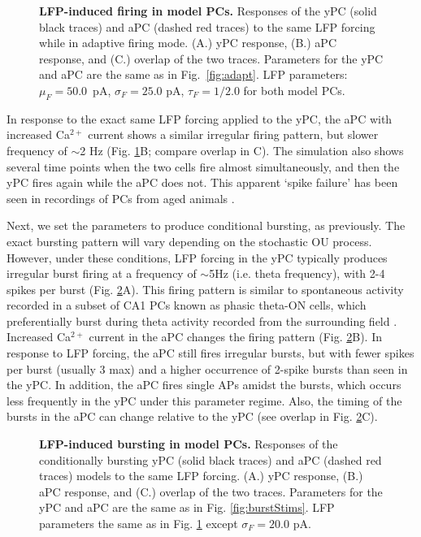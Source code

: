 \documentclass[10pt,letterpaper]{article}
\newcommand{\Ca}{Ca$^{2+}$}
\begin{document}
\begin{figure}[h!]
\centering
\caption{{\bf LFP-induced firing in model PCs.}
Responses of the yPC (solid black traces) and aPC (dashed red traces) to the same LFP forcing while in adaptive firing mode. (A.) yPC response, (B.) aPC response, and (C.) overlap of the two traces. Parameters for the yPC and aPC are the same as in Fig.~\ref{fig:adapt}. LFP parameters: $\mu_{F}=50.0$~pA, $\sigma_{F}=25.0$ pA, $\tau_{F}=1/2.0$ for both model PCs.}
\label{fig:LFPadaptive}
\end{figure}

In response to the exact same LFP forcing applied to the yPC, the aPC with increased {\Ca} current shows a similar irregular firing pattern, but slower frequency of $\sim$2 Hz (Fig. \ref{fig:LFPadaptive}B; compare overlap in C). The simulation also shows several time points when the two cells fire almost simultaneously, and then the yPC fires again while the aPC does not. This apparent `spike failure' has been seen in recordings of PCs from aged animals \cite{gant2009action}. 

Next, we set the parameters to produce conditional bursting, as previously. The exact bursting pattern will vary depending on the stochastic OU process. However, under these conditions, LFP forcing in the yPC typically produces irregular burst firing at a frequency of $\sim$5Hz (i.e. theta frequency), with 2-4 spikes per burst (Fig. \ref{fig:LFPbursting}A). This firing pattern is similar to spontaneous activity recorded in a subset of CA1 PCs known as phasic theta-ON cells, which preferentially burst during theta activity recorded from the surrounding field \cite{bland2005heterogeneity,colom1987state}. Increased {\Ca} current in the aPC changes the firing pattern (Fig. \ref{fig:LFPbursting}B). In response to LFP forcing, the aPC still fires irregular bursts, but with fewer spikes per burst (usually 3 max) and a higher occurrence of 2-spike bursts than seen in the yPC. In addition, the aPC fires single APs amidst the bursts, which occurs less frequently in the yPC under this parameter regime. Also, the timing of the bursts in the aPC can change relative to the yPC (see overlap in Fig. \ref{fig:LFPbursting}C).

\begin{figure}[h!]
\centering
\caption{{\bf LFP-induced bursting in model PCs.}
Responses of the conditionally bursting yPC (solid black traces) and aPC (dashed red traces) models to the same LFP forcing. (A.) yPC response, (B.) aPC response, and (C.) overlap of the two traces. Parameters for the yPC and aPC are the same as in Fig. \ref{fig:burstStims}. LFP parameters the same as in Fig. \ref{fig:LFPadaptive} except $\sigma_{F}=20.0$ pA.}
\label{fig:LFPbursting}
\end{figure}
\end{document}
